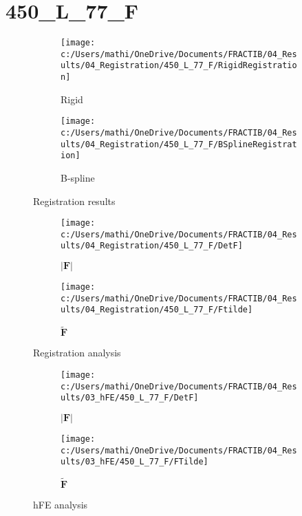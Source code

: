 \documentclass{article}%
\begin{document}
%
\newpage%
\section*{450\_L\_77\_F}%
\label{sec:450L77F}%


\begin{figure}[h!]%
\begin{subfigure}[b]{0.5\linewidth}%
\texttt{[image: c:/Users/mathi/OneDrive/Documents/FRACTIB/04\_Results/04\_Registration/450\_L\_77\_F/RigidRegistration]}%
\caption{Rigid}%
\end{subfigure}%
\begin{subfigure}[b]{0.5\linewidth}%
\texttt{[image: c:/Users/mathi/OneDrive/Documents/FRACTIB/04\_Results/04\_Registration/450\_L\_77\_F/BSplineRegistration]}%
\caption{B{-}spline}%
\end{subfigure}%
\caption{Registration results}%
\end{figure}

%


\begin{figure}[h!]%
\begin{subfigure}[b]{0.5\linewidth}%
\texttt{[image: c:/Users/mathi/OneDrive/Documents/FRACTIB/04\_Results/04\_Registration/450\_L\_77\_F/DetF]}%
\caption{$|\mathbf{F}|$}%
\end{subfigure}%
\begin{subfigure}[b]{0.5\linewidth}%
\texttt{[image: c:/Users/mathi/OneDrive/Documents/FRACTIB/04\_Results/04\_Registration/450\_L\_77\_F/Ftilde]}%
\caption{$\tilde{\mathbf{F}}$}%
\end{subfigure}%
\caption{Registration analysis}%
\end{figure}

%


\begin{figure}[h!]%
\begin{subfigure}[b]{0.5\linewidth}%
\texttt{[image: c:/Users/mathi/OneDrive/Documents/FRACTIB/04\_Results/03\_hFE/450\_L\_77\_F/DetF]}%
\caption{$|\mathbf{F}|$}%
\end{subfigure}%
\begin{subfigure}[b]{0.5\linewidth}%
\texttt{[image: c:/Users/mathi/OneDrive/Documents/FRACTIB/04\_Results/03\_hFE/450\_L\_77\_F/FTilde]}%
\caption{$\tilde{\mathbf{F}}$}%
\end{subfigure}%
\caption{hFE analysis}%
\end{figure}
\end{document}
